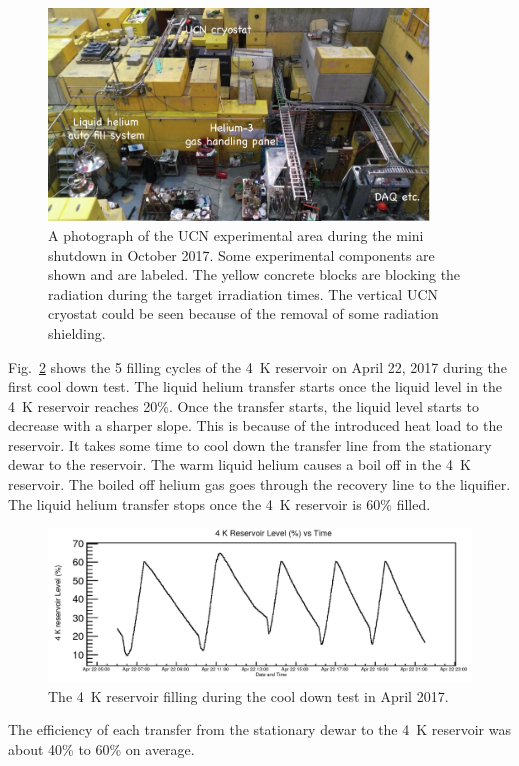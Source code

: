 \begin{figure}[h!]
  \centering
  \includegraphics[width=0.9\textwidth]{ucnarea.png}
  \caption{A photograph of the UCN experimental area during the mini
    shutdown in October 2017. Some experimental components are shown
    and are labeled. The yellow concrete blocks are blocking the
    radiation during the target irradiation times. The vertical UCN
    cryostat could be seen because of the removal of some radiation
    shielding. }
  \label{fig:ucnarea}
\end{figure}

Fig.~\ref{fig:4kfilling} shows the 5 filling cycles of the 4~K
reservoir on April 22, 2017 during the first cool down test. The
liquid helium transfer starts once the liquid level in the 4~K
reservoir reaches 20\%. Once the transfer starts, the liquid level
starts to decrease with a sharper slope. This is because of the
introduced heat load to the reservoir. It takes some time to cool down
the transfer line from the stationary dewar to the reservoir. The warm
liquid helium causes a boil off in the 4~K reservoir. The boiled off
helium gas goes through the recovery line to the liquifier. The liquid
helium transfer stops once the 4~K reservoir is 60\% filled.

\begin{figure}[h!]
  \centering
  \includegraphics[width=1.0\textwidth]{april_4kfilling.png}
  \caption{The 4~K reservoir filling during the cool down test in April 2017.}
  \label{fig:4kfilling}
\end{figure}
The efficiency of each transfer from the stationary dewar to the 4~K
reservoir was about 40\% to 60\% on average.

